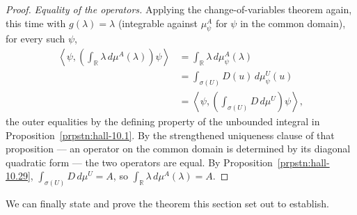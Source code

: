 \begin{proof}
\textit{Equality of the operators.} Applying the change-of-variables theorem again, this time with $g(\lambda) = \lambda$ (integrable against $\mu^A_\psi$ for $\psi$ in the common domain), for every such $\psi$,
\begin{align}
    \left< \psi, \left( \int_{\mathbb{R}} \lambda \, d\mu^A(\lambda) \right)\psi \right> &= \int_{\mathbb{R}} \lambda \, d\mu^A_\psi(\lambda) \\
                &= \int_{\sigma(U)} D(u) \, d\mu^U_\psi(u) \\
                &= \left< \psi, \left( \int_{\sigma(U)} D \, d\mu^U \right)\psi \right>,
\end{align}
the outer equalities by the defining property of the unbounded integral in Proposition~\ref{prpstn:hall-10.1}. By the strengthened uniqueness clause of that proposition — an operator on the common domain is determined by its diagonal quadratic form — the two operators are equal. By Proposition~\ref{prpstn:hall-10.29}, $\int_{\sigma(U)}D\,d\mu^U = A$, so $\int_{\mathbb{R}}\lambda\,d\mu^A(\lambda) = A$.
\end{proof}

We can finally state and prove the theorem this section set out to establish.

